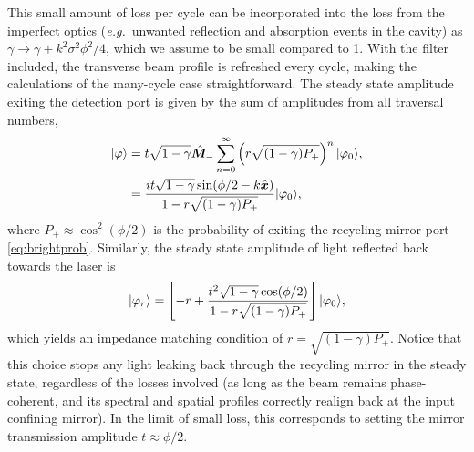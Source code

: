 This small amount of loss per cycle can be incorporated into the loss from the imperfect optics (\emph{e.g.}~unwanted reflection and absorption events in the cavity) as $\gamma \rightarrow \gamma + k^2\sigma^2 \phi^2/4$, which we assume to be small compared to 1. With the filter included, the transverse beam profile is refreshed every cycle, making the calculations of the many-cycle case straightforward. The steady state amplitude exiting the detection port is given by the sum of amplitudes from all traversal numbers,
\begin{align}\label{eq:collimatedamplitude}
	\lvert \varphi\rangle &= t \sqrt{1-\gamma}\hat{\bm M}_-  \sum_{n=0}^{\infty} \left( r\sqrt{(1-\gamma) P_+}  \right)^n \lvert \varphi_0\rangle, \nonumber \\
	&=  \frac{i t \sqrt{1-\gamma}\sin(\phi/2 - k\hat{\bm x})}{1 - r\sqrt{(1-\gamma) P_+}}\lvert \varphi_0\rangle,
\end{align}
where $P_+ \approx \cos^2(\phi/2)$ is the probability of exiting the recycling mirror port \eqref{eq:brightprob}.  Similarly, the steady state amplitude of light reflected back towards the laser is
\begin{equation}
	\lvert \varphi_r\rangle = \left[-r + \frac{t^2 \sqrt{1-\gamma} \cos(\phi/2)}{1 - r\sqrt{(1-\gamma) P_+}}\right]\lvert \varphi_0\rangle, 
\end{equation}
which yields an impedance matching condition of $r = \sqrt{(1 - \gamma) P_+}$.  Notice that this choice stops any light leaking back through the recycling mirror in the steady state, regardless of the losses involved (as long as the beam remains phase-coherent, and its spectral and spatial profiles correctly realign back at the input confining mirror).  In the limit of small loss, this corresponds to setting the mirror transmission amplitude $t \approx \phi/2$.


